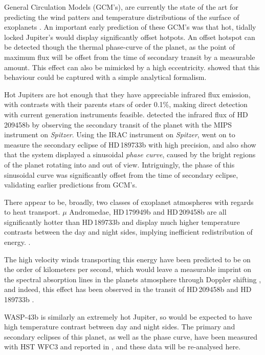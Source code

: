 \documentclass[a4paper,fleqn,usenatbib]{mnras}
\begin{document}
General Circulation Models (GCM's), are currently the state of the art for predicting the wind patters and temperature distributions of the surface of exoplanets \citep[e.g.][]{Showman2008}. An important early prediction of these GCM's was that hot, tidally locked Jupiter's would display significantly offset hotpots. An offset hotspot can be detected though the thermal phase-curve of the planet, as the point of maximum flux will be offset from the time of secondary transit by a measurable amount. This effect can also be mimicked by a high eccentricity. \citet{Zhang2016} showed that this behaviour could be captured with a simple analytical formalism.

Hot Jupiters are hot enough that they have appreciable infrared flux emission, with contrasts with their parents stars of order 0.1\%, making direct detection with current generation instruments feasible. \citet{Deming2005} detected the infrared flux of HD\,209458b by observing the secondary transit of the planet with the MIPS instrument on \emph{Spitzer}. Using the IRAC instrument on \emph{Spitzer}, \citet{Knutson2007b} went on to measure the secondary eclipse of HD\,189733b with high precision, and also show that the system displayed a sinusoidal \emph{phase curve}, caused by the bright regions of the planet rotating into and out of view. Intriguingly, the phase of this sinusoidal curve was significantly offset from the time of secondary eclipse, validating earlier predictions from GCM's.

There appear to be, broadly, two classes of exoplanet atmospheres with regards to heat transport. $\mu$ Andromedae, HD\,179949b and HD\,209458b are all significantly hotter than HD\,189733b and display much higher temperature contrasts between the day and night sides, implying inefficient redistribution of energy. \citep{Harrington2006,Cowan2007,zellem2014}. 

The high velocity winds transporting this energy have been predicted to be on the order of kilometers per second, which would leave a measurable imprint on the spectral absorption lines in the planets atmosphere through Doppler shifting \citep[e.g.][]{Showman2013}, and indeed, this effect has been observed in the transit of HD\,209458b \citep{Snellen2010} and HD\,189733b \citep{Louden2015}. 

WASP-43b is similarly an extremely hot Jupiter, so would be expected to have high temperature contrast between day and night sides. The primary and secondary eclipses of this planet, as well as the phase curve, have been measured with HST WFC3 and reported in \citep{Stevenson2014}, and these data will be re-analysed here.
\end{document}
